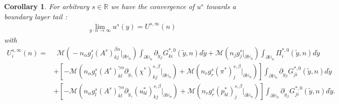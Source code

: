 \documentclass[11pt, reqno]{amsart}
\newtheorem{corollary}[theorem]{Corollary}
\theoremstyle{definition}
\theoremstyle{remark}
\numberwithin{equation}{section}
\begin{document}
	
	\begin{corollary}
 For  arbitrary  $s\in\mathbb{R}$  	we have the convergence of $u^s$ towards a boundary layer tail :
	\begin{align}
		\lim_{y\cdot n \rightarrow \infty} u^s(y)=  U^{s,\infty}(n)
	\end{align}	
	with
	\begin{align*}
		U_i^{s,\infty}(n)
		=&\:\:	 \mathcal{M} \left(\! - n_\alpha g^s_j (A^s)^{\beta\alpha}_{kj} |_{\partial\mathbb{H}_n} \! \right)\!\!\int_{\partial\mathbb{H}_n}\!\! \partial_{\tilde{y}_\beta} G^{*,0}_{ki} \left(\tilde{y},n\right) d\tilde{y}+  \mathcal{M} \left( n_j g^s_j|_{\partial\mathbb{H}_n} \right)\!\!\int_{\partial\mathbb{H}_n}\!\!\! \Pi^{*,0}_i\left(\tilde{y},n\right) d\tilde{y}\\
		&+\left[-\mathcal{M}(n_\alpha g^s_l (A^s)^{\gamma\alpha}_{kl}\partial_{ \tilde{y}_\gamma}  (\chi^*)_{kj}^{s,\beta}|_{\partial\mathbb{H}_n}) + \mathcal{M}\left( n_r g^s_r (\pi^*)_{j}^{s,\beta} |_{\partial\mathbb{H}_n} \right) \right]\!
		\int_{\partial\mathbb{H}_n}\!\!\partial_{\tilde{y}_\beta} G^{*,0}_{ji}(\tilde{y},n) d\tilde{y} \\
		&+ \left[ -\mathcal{M}(n_\alpha g^s_l (A^s)^{\gamma\alpha}_{kl}\partial_{ \tilde{y}_\gamma}  (u_{bl}^*)_{kj}^{s,\beta}|_{\partial\mathbb{H}_n})+
		\mathcal{M}\left( n_r g^s_r( p_{bl}^*)_{j}^{s,\beta} |_{\partial\mathbb{H}_n} \right) \right]
		\int_{\partial\mathbb{H}_n}  \partial_{\tilde{y}_\beta}G^{*,0}_{ji}(\tilde{y},n) d\tilde{y}.\\
	\end{align*}	
	\end{corollary}
	
\end{document}
